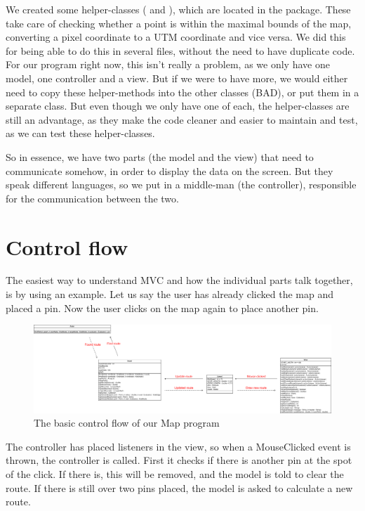 We created some helper-classes ( and ), 
which are located in the  package. These take care of checking whether a point 
is within the maximal bounds of the map, converting a pixel coordinate to a UTM coordinate 
and vice versa. We did this for being able to do this in several files, without the need to have 
duplicate code. For our program right now, this isn't really a problem, as we only have one 
model, one controller and a view. But if we were to have more, we would either need to copy 
these helper-methods into the other classes (BAD), or put them in a separate class. But even 
though we only have one of each, the helper-classes are still an advantage, as they make the 
code cleaner and easier to maintain and test, as we can test these helper-classes.

So in essence, we have two parts (the model and the view) that need to communicate 
somehow, in order to display the data on the screen. But they speak different languages, so 
we put in a middle-man (the controller), responsible for the communication between the two.

\section{Control flow}
\label{UML-CF}
The easiest way to understand MVC and how the individual parts talk together, is by using 
an example. Let us say the user has already clicked the map and placed a pin. Now the 
user clicks on the map again to place another pin.

\begin{figure}[h!]
\centering
\includegraphics[width=1.25\linewidth]{images/control-flow}
\caption{The basic control flow of our Map program}
\label{control-flow}
\end{figure}
 
The controller has placed listeners in the view, so when a MouseClicked event is thrown, 
the controller is called. First it checks if there is another pin at the spot of the click. If there 
is, this will be removed, and the model is told to clear the route. If there is still over two 
pins placed, the model is asked to calculate a new route.


